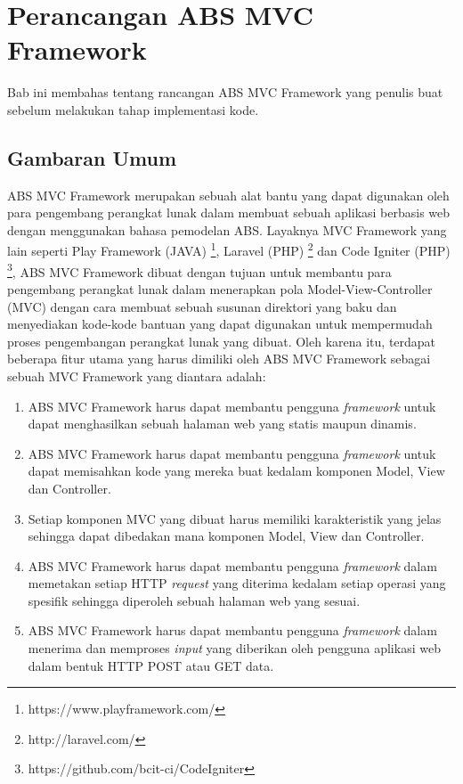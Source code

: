 \chapter{Perancangan ABS MVC Framework}

Bab ini membahas tentang rancangan ABS MVC Framework yang penulis buat sebelum melakukan tahap implementasi kode.

\section{Gambaran Umum}

ABS MVC Framework merupakan sebuah alat bantu yang dapat digunakan oleh para pengembang perangkat lunak dalam membuat sebuah aplikasi berbasis web dengan menggunakan bahasa pemodelan ABS. Layaknya MVC Framework yang lain seperti Play Framework (JAVA) \footnote{https://www.playframework.com/}, Laravel (PHP) \footnote{http://laravel.com/} dan Code Igniter (PHP) \footnote{https://github.com/bcit-ci/CodeIgniter}, ABS MVC Framework dibuat dengan tujuan untuk membantu para pengembang perangkat lunak dalam menerapkan pola Model-View-Controller (MVC) dengan cara membuat sebuah susunan direktori yang baku dan menyediakan kode-kode bantuan yang dapat digunakan untuk mempermudah proses pengembangan perangkat lunak yang dibuat. Oleh karena itu, terdapat beberapa fitur utama yang harus dimiliki oleh ABS MVC Framework sebagai sebuah MVC Framework yang diantara adalah:

\begin{enumerate}
    \item ABS MVC Framework harus dapat membantu pengguna \textit{framework} untuk dapat menghasilkan sebuah halaman web yang statis maupun dinamis.
    \item ABS MVC Framework harus dapat membantu pengguna \textit{framework} untuk dapat memisahkan kode yang mereka buat kedalam komponen Model, View dan Controller.
    \item Setiap komponen MVC yang dibuat harus memiliki karakteristik yang jelas sehingga dapat dibedakan mana komponen Model, View dan Controller.
    \item ABS MVC Framework harus dapat membantu pengguna \textit{framework} dalam memetakan setiap HTTP \textit{request} yang diterima kedalam setiap operasi yang spesifik sehingga diperoleh sebuah halaman web yang sesuai.
    \item ABS MVC Framework harus dapat membantu pengguna \textit{framework} dalam menerima dan memproses \textit{input} yang diberikan oleh pengguna aplikasi web dalam bentuk HTTP POST atau GET data. 
\end{enumerate}

